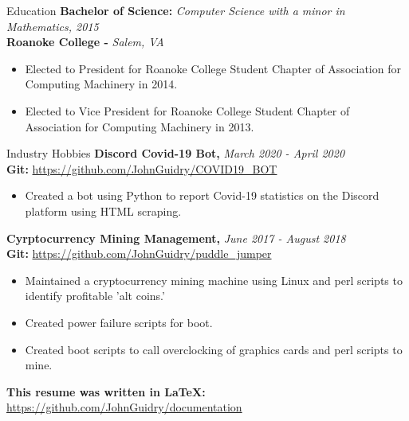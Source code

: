 \documentclass{resume} %
\begin{document}
\begin{rSection}{Education}
{\bf Bachelor of Science: }{\em Computer Science with a minor in Mathematics, 2015} 
\\
{\bf Roanoke College -  }{\em Salem, VA}
\begin{itemize}
\item Elected to President for Roanoke College Student Chapter of Association for Computing Machinery in 2014.
\item Elected to Vice President for Roanoke College Student Chapter of Association for Computing Machinery in 2013.
\end{itemize}
\end{rSection}



\begin{rSection}{Industry Hobbies} 
{\bf Discord Covid-19 Bot, }{\em March 2020 - April 2020} 
\\
{\bf Git: }\url {https://github.com/JohnGuidry/COVID19_BOT}
\begin{itemize}
\item Created a bot using Python to report Covid-19 statistics on the Discord platform using HTML scraping.
\end{itemize}

{\bf Cyrptocurrency Mining Management, }{\em June 2017 - August 2018} 
\\
{\bf Git: }\url {https://github.com/JohnGuidry/puddle_jumper}
\begin{itemize}
\item Maintained a cryptocurrency mining machine using Linux and perl scripts to identify profitable 'alt coins.'
\item Created power failure scripts for boot.
\item Created boot scripts to call overclocking of graphics cards and perl scripts to mine.
\end{itemize}

{\bf This resume was written in LaTeX: }\url{https://github.com/JohnGuidry/documentation}
\end{rSection}
\end{document}
